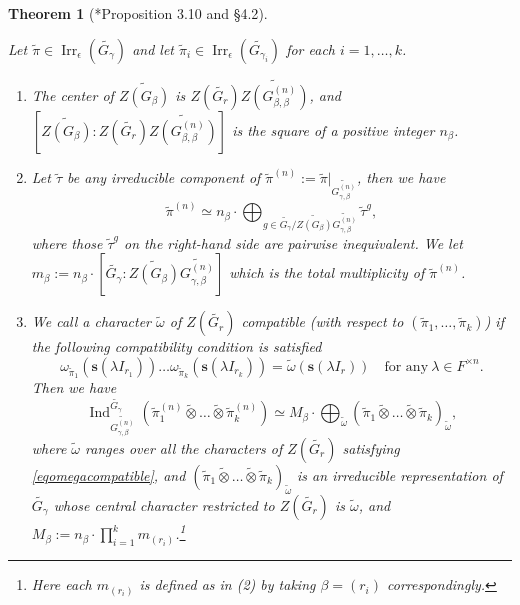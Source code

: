 \documentclass{amsart}
\numberwithin{equation}{section}
\newtheorem{theorem}{\bf{Theorem}}[section]
\newcommand{\rest}{\lvert}
\newcommand{\mrirr}{\operatorname{Irr}}
\newcommand{\mrInd}{\operatorname{Ind}}
\newcommand{\bs}[1]{\boldsymbol{#1}}
\newcommand{\wt}[1]{\widetilde{#1}}
\begin{document}
	\begin{theorem}[\cite{kaplan2022classification}*{Proposition 3.10 and \S 4.2}]\label{thmMTP}
		
		Let $\wt{\pi}\in\mrirr_{\epsilon}(\wt{G_{\gamma}})$ and let $\wt{\pi}_{i}\in\mrirr_{\epsilon}(\wt{G_{\gamma_{i}}})$ for each $i=1,\dots,k$.
		
		\begin{enumerate}
			\item  The center of $\wt{Z(G_{\beta})}$ is $Z(\wt{G_{r}})\wt{Z(G_{\beta,\beta}^{(n)})}$, and $[\wt{Z(G_{\beta})}:Z(\wt{G_{r}})\wt{Z(G_{\beta,\beta}^{(n)})}]$ is the square of a positive integer $n_{\beta}$.
			
			\item Let $\wt{\tau}$ be any irreducible component of $\wt{\pi}^{(n)}:=\wt{\pi}\rest_{\wt{G_{\gamma,\beta}^{(n)}}}$, then we have
			\begin{equation}\label{eqpirestGgamman}
				\wt{\pi}^{(n)}\simeq n_{\beta}\cdot\bigoplus_{g\in\wt{G_{\gamma}}/\wt{Z(G_{\beta})}\wt{G_{\gamma,\beta}^{(n)}}}\wt{\tau}^{g},
			\end{equation}
			where those $\wt{\tau}^{g}$ on the right-hand side are pairwise inequivalent.
			We let $m_{\beta}:=n_{\beta}\cdot[\wt{G_{\gamma}}:\wt{Z(G_{\beta})}\wt{G_{\gamma,\beta}^{(n)}}]$ which is the total multiplicity of $\wt{\pi}^{(n)}$.
			
			\item We call a character $\wt{\omega}$ of $Z(\wt{G_{r}})$ \emph{compatible} (with respect to $(\wt{\pi}_{1},\dots,\wt{\pi}_{k})$) if the following compatibility condition is satisfied
			\begin{equation}\label{eqomegacompatible}
				\omega_{\wt{\pi}_{1}}(\bs{s}(\lambda I_{r_{1}}))\dots\omega_{\wt{\pi}_{k}}(\bs{s}(\lambda I_{r_{k}}))=\wt{\omega}(\bs{s}(\lambda I_{r}))\quad\text{for any}\ \lambda\in F^{\times n}.
			\end{equation}
			Then we have
			\begin{equation}\label{eqMTPdef}
				\mrInd_{\wt{G_{\gamma,\beta}^{(n)}}}^{\wt{G_{\gamma}}}(\wt{\pi}_{1}^{(n)}\wt{\otimes}\dots\wt{\otimes}\wt{\pi}_{k}^{(n)})\simeq M_{\beta}\cdot\bigoplus_{\wt{\omega}}(\wt{\pi}_{1}\wt{\otimes}\dots\wt{\otimes}\wt{\pi}_{k})_{\wt{\omega}},
			\end{equation}
			where $\wt{\omega}$ ranges over all the characters of $Z(\wt{G_{r}})$ satisfying \eqref{eqomegacompatible}, and $(\wt{\pi}_{1}\wt{\otimes}\dots\wt{\otimes}\wt{\pi}_{k})_{\wt{\omega}}$ is an irreducible representation of $\wt{G_{\gamma}}$ whose central character restricted to $Z(\wt{G_{r}})$ is $\wt{\omega}$, and $M_{\beta}:=n_{\beta}\cdot\prod_{i=1}^{k}m_{(r_{i})}$.\footnote{Here each $m_{(r_{i})}$ is defined as in (2) by taking $\beta=(r_{i})$ correspondingly.}
			

\end{enumerate}
\end{theorem}
\end{document}
